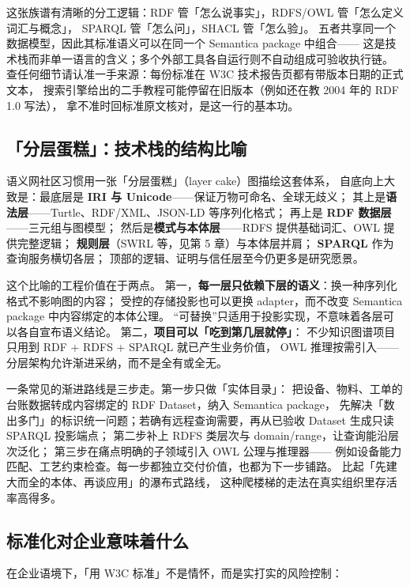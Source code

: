 这张族谱有清晰的分工逻辑：RDF 管「怎么说事实」，RDFS/OWL 管「怎么定义词汇与概念」，
SPARQL 管「怎么问」，SHACL 管「怎么验」。
五者共享同一个数据模型，因此其标准语义可以在同一个 Semantica package 中组合——
这是技术栈而非单一语言的含义；多个外部工具各自运行则不自动组成可验收执行链。
查任何细节请认准一手来源：每份标准在 W3C 技术报告页都有带版本日期的正式文本，
搜索引擎给出的二手教程可能停留在旧版本（例如还在教 2004 年的 RDF 1.0 写法），
拿不准时回标准原文核对，是这一行的基本功。

\subsection{「分层蛋糕」：技术栈的结构比喻}

语义网社区习惯用一张「分层蛋糕」（layer cake）图描绘这套体系，
自底向上大致是：最底层是 \textbf{IRI 与 Unicode}——保证万物可命名、全球无歧义；
其上是\textbf{语法层}——Turtle、RDF/XML、JSON-LD 等序列化格式；
再上是 \textbf{RDF 数据层}——三元组与图模型；
然后是\textbf{模式与本体层}——RDFS 提供基础词汇、OWL 提供完整逻辑；
\textbf{规则层}（SWRL 等，见第 5 章）与本体层并肩；
\textbf{SPARQL} 作为查询服务横切各层；
顶部的逻辑、证明与信任层至今仍更多是研究愿景。

这个比喻的工程价值在于两点。
第一，\textbf{每一层只依赖下层的语义}：换一种序列化格式不影响图的内容；
受控的存储投影也可以更换 adapter，而不改变 Semantica package 中内容绑定的本体公理。
“可替换”只适用于投影实现，不意味着各层可以各自宣布语义结论。
第二，\textbf{项目可以「吃到第几层就停」}：
不少知识图谱项目只用到 RDF + RDFS + SPARQL 就已产生业务价值，
OWL 推理按需引入——分层架构允许渐进采纳，而不是全有或全无。

一条常见的渐进路线是三步走。第一步只做「实体目录」：
把设备、物料、工单的台账数据转成内容绑定的 RDF Dataset，纳入 Semantica package，
先解决「数出多门」的标识统一问题；若确有远程查询需要，再从已验收 Dataset
生成只读 SPARQL 投影端点；
第二步补上 RDFS 类层次与 domain/range，让查询能沿层次泛化；
第三步在痛点明确的子领域引入 OWL 公理与推理器——
例如设备能力匹配、工艺约束检查。每一步都独立交付价值，也都为下一步铺路。
比起「先建大而全的本体、再谈应用」的瀑布式路线，
这种爬楼梯的走法在真实组织里存活率高得多。

\subsection{标准化对企业意味着什么}

在企业语境下，「用 W3C 标准」不是情怀，而是实打实的风险控制：


